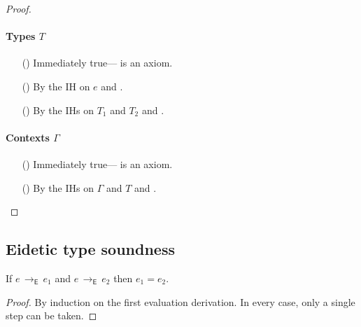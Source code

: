 \documentclass[9pt]{extarticle}
\newcommand{\ottnt}[1]{\mathit{#1}}
\newcommand{\ottsym}[1]{#1}
\begin{document}
{\begin{lemma}
\begin{proof}
{    \paragraph{Types $\ottnt{T}$}
    \begin{itemize}
    \item[(\WF{Base})] Immediately true--- is an axiom.
    \item[(\WF{Refine})] By the IH on $\ottnt{e}$ and .
    \item[(\WF{Fun})] By the IHs on $\ottnt{T_{{\mathrm{1}}}}$ and $\ottnt{T_{{\mathrm{2}}}}$ and .
    \end{itemize}

    \paragraph{Contexts $\Gamma$}
    \begin{itemize}
    \item[(\WF{Empty})] Immediately true--- is an axiom.
    \item[(\WF{Extend})] By the IHs on $\Gamma$ and $\ottnt{T}$ and
      .
    \end{itemize}
    \fi}
  \end{proof}
\end{lemma}
\fi}

\subsection{Eidetic type soundness}
\label{app:eideticsoundness}

\begin{lemma}
  \label{lem:eideticdeterminism}
  If $\ottnt{e} \,  \longrightarrow _{  \mathsf{E}  }  \, \ottnt{e_{{\mathrm{1}}}}$ and $\ottnt{e} \,  \longrightarrow _{  \mathsf{E}  }  \, \ottnt{e_{{\mathrm{2}}}}$ then $\ottnt{e_{{\mathrm{1}}}}  \ottsym{=}  \ottnt{e_{{\mathrm{2}}}}$.
\begin{proof}
    By induction on the first evaluation derivation. In every case,
    only a single step can be taken.
  \end{proof}
\end{lemma}
\end{document}
